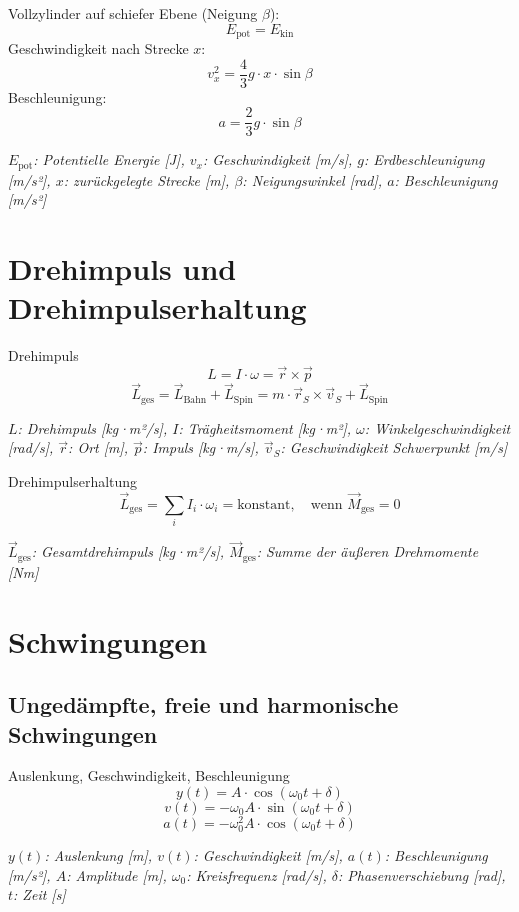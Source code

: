 \documentclass[a5paper,10pt]{article}
\newenvironment{displayformula}
{
	\begin{framed}
		\color{formulaColor}
	}
	{\end{framed}}
\newcommand{\formulalegend}[1]{%
	\par\vspace{0.5ex}%
	{{\color{legendColor}\RaggedRight\small\textit{#1}}}%
	\par\vspace{1.5ex}%
}
\begin{document}
\begin{displayformula}
	Vollzylinder auf schiefer Ebene (Neigung \( \beta \)):
	\[
	E_{\text{pot}} = E_{\text{kin}}
	\]
	Geschwindigkeit nach Strecke \( x \):
	\[
	v_x^2 = \frac{4}{3} g \cdot x \cdot \sin\beta
	\]
	Beschleunigung:
	\[
	a = \frac{2}{3} g \cdot \sin\beta
	\]
\end{displayformula}
\formulalegend{
	\( E_{\text{pot}} \): Potentielle Energie [J], \( v_x \): Geschwindigkeit [m/s], \( g \): Erdbeschleunigung [m/s²], \( x \): zurückgelegte Strecke [m], \( \beta \): Neigungswinkel [rad], \( a \): Beschleunigung [m/s²]
}
\newpage
\section{Drehimpuls und Drehimpulserhaltung}

\begin{displayformula}
	Drehimpuls
	\[
	L = I \cdot \omega = \vec{r} \times \vec{p}
	\]
	\[
	\vec{L}_{\text{ges}} = \vec{L}_{\text{Bahn}} + \vec{L}_{\text{Spin}} = m \cdot \vec{r}_S \times \vec{v}_S + \vec{L}_{\text{Spin}}
	\]
\end{displayformula}
\formulalegend{
	\( L \): Drehimpuls [kg·m²/s], \( I \): Trägheitsmoment [kg·m²], \( \omega \): Winkelgeschwindigkeit [rad/s], \( \vec{r} \): Ort [m], \( \vec{p} \): Impuls [kg·m/s], \( \vec{v}_S \): Geschwindigkeit Schwerpunkt [m/s]
}

\begin{displayformula}
	Drehimpulserhaltung
	\[
	\vec{L}_{\text{ges}} = \sum_i I_i \cdot \omega_i = \text{konstant}, \quad \text{wenn } \vec{M}_{\text{ges}} = 0
	\]
\end{displayformula}
\formulalegend{
	\( \vec{L}_{\text{ges}} \): Gesamtdrehimpuls [kg·m²/s], \( \vec{M}_{\text{ges}} \): Summe der äußeren Drehmomente [Nm]
}
\newpage
\section{Schwingungen}

\subsection{Ungedämpfte, freie und harmonische Schwingungen}

\begin{displayformula}
	Auslenkung, Geschwindigkeit, Beschleunigung
	\[
	y(t) = A \cdot \cos(\omega_0 t + \delta)
	\]
	\[
	v(t) = -\omega_0 A \cdot \sin(\omega_0 t + \delta)
	\]
	\[
	a(t) = -\omega_0^2 A \cdot \cos(\omega_0 t + \delta)
	\]
\end{displayformula}
\formulalegend{
	\( y(t) \): Auslenkung [m], \( v(t) \): Geschwindigkeit [m/s], \( a(t) \): Beschleunigung [m/s²], \( A \): Amplitude [m], \( \omega_0 \): Kreisfrequenz [rad/s], \( \delta \): Phasenverschiebung [rad], \( t \): Zeit [s]
}
\end{document}
